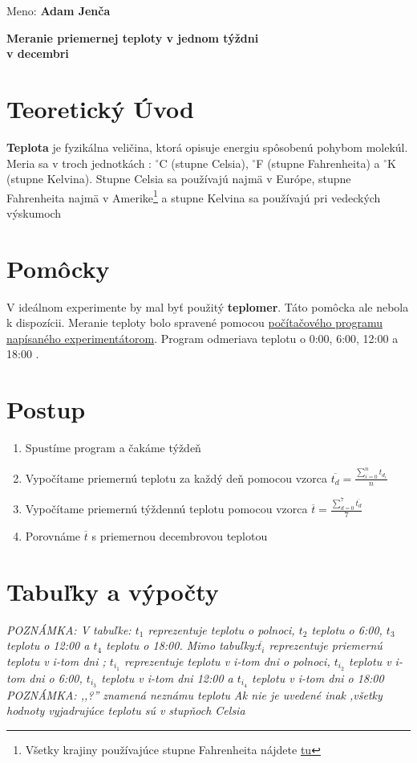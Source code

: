 \documentclass{article}
\begin{document}
\large Meno: \textbf{Adam Jenča}
\begin{center} 
	\huge \textbf{Meranie priemernej teploty v jednom týždni \\ v decembri} 
\end{center}
\normalsize
\vskip 5cm
\section{Teoretický Úvod}
\textbf{Teplota} je fyzikálna veličina, ktorá opisuje energiu spôsobenú pohybom molekúl.
Meria sa v troch jednotkách : $^{\circ}$C (stupne Celsia), $^{\circ}$F (stupne Fahrenheita) a $^{\circ}$K (stupne Kelvina). Stupne Celsia sa používajú najmä v Európe, stupne Fahrenheita najmä v Amerike\footnote{Všetky krajiny používajúce stupne Fahrenheita nájdete \href{https://worldpopulationreview.com/country-rankings/countries-that-use-fahrenheit}{tu}} a stupne Kelvina sa používajú pri vedeckých výskumoch
\section{Pomôcky}
V ideálnom experimente by mal byť použitý \textbf{teplomer}.
Táto pomôcka ale nebola k dispozícii.
Meranie teploty bolo spravené pomocou \href{https://github.com/jenca-adam/skolskeveci/blob/main/fyzika/teplota/data.py}{počítačového programu napísaného experimentátorom}.
Program odmeriava teplotu o 0:00, 6:00, 12:00 a  18:00 .
\section{Postup}
\begin{enumerate}
\item Spustíme program a čakáme týždeň\\
\item  Vypočítame priemernú teplotu za každý deň pomocou vzorca  $\overline{t_d} = \frac{\displaystyle \sum_{i=0}^{n} t_{d_i}}{n}$
\item Vypočítame priemernú týždennú teplotu pomocou vzorca $\overline{t}=\frac{\displaystyle \sum_{d=0}^7 \overline{t_d}}{7}$
\item Porovnáme $\overline{t}$ s priemernou decembrovou teplotou
\end{enumerate}
\section{Tabuľky a výpočty}
\textit{POZNÁMKA: V tabuľke: $t_1$ reprezentuje teplotu o polnoci, $t_2$ teplotu o 6:00, $t_3$ teplotu o 12:00 a $t_4$ teplotu o 18:00. Mimo tabuľky:$\overline{t_i}$ reprezentuje priemernú teplotu v i-tom dni ; $t_{i_1}$ reprezentuje teplotu v i-tom dni o polnoci, $t_{i_2}$ teplotu v i-tom dni o 6:00, $t_{i_3}$ teplotu v i-tom dni 12:00 a $t_{i_4}$ teplotu v i-tom dni o 18:00}\\
\textit{POZNÁMKA: ,,?'' znamená neznámu teplotu}
\textit{Ak nie je uvedené inak ,všetky hodnoty vyjadrujúce teplotu sú v stupňoch Celsia}
\end{document}
